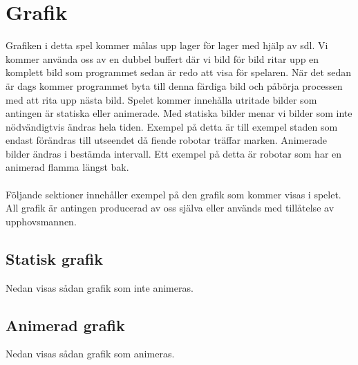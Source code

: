 \documentclass{TDP003mall}
\begin{document}
\section{Grafik}
Grafiken i detta spel kommer målas upp lager för lager med hjälp av sdl. Vi kommer använda oss av en dubbel buffert där vi bild för bild ritar upp en komplett bild som programmet sedan är redo att visa för spelaren. När det sedan är dags kommer programmet byta till denna färdiga bild och påbörja processen med att rita upp nästa bild. Spelet kommer innehålla utritade bilder som antingen är statiska eller animerade. Med statiska bilder menar vi bilder som inte nödvändigtvis ändras hela tiden. Exempel på detta är till exempel staden som endast förändras till utseendet då fiende robotar träffar marken. Animerade bilder ändras i bestämda intervall. Ett exempel på detta är robotar som har en animerad flamma längst bak.\\\\

Följande sektioner innehåller exempel på den grafik som kommer visas i spelet. All grafik är antingen producerad av oss själva eller används med tillåtelse av upphovsmannen.

\subsection{Statisk grafik}
Nedan visas sådan grafik som inte animeras.

\subsection{Animerad grafik}
Nedan visas sådan grafik som animeras.
\end{document}
